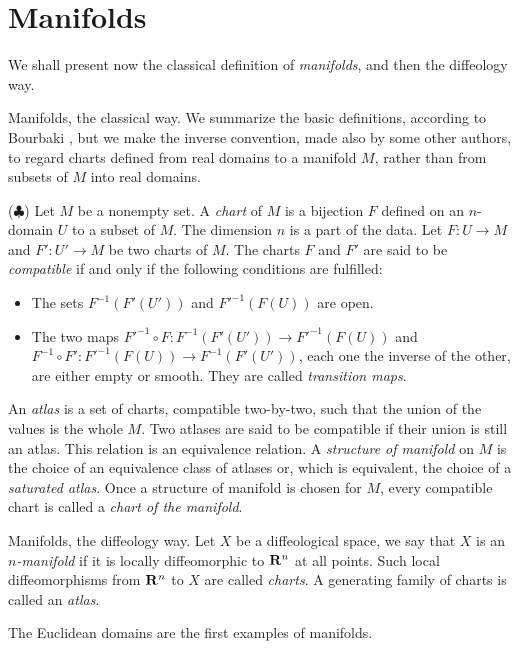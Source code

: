 \section{Manifolds}

We shall present now the classical definition of \emph{manifolds},
and then the diffeology way.

\begin{Article}{Manifolds, the classical way.}{}
  We summarize the basic definitions,
  according to Bourbaki \cite{Bou82},
  but we make the inverse convention,
  made also by some other authors,
  to regard charts defined from real domains to a manifold $M$,
  rather than from subsets of $M$ into real domains.

  ($\clubsuit$) Let $M$ be a nonempty set.
  A {\em chart} of $M$ is a bijection $F$ defined on an $n$-domain $U$ to a subset of $M$.
  The dimension $n$ is a part of the data.
  Let $F : U \to M$ and $F' : U' \to M$ be two charts of $M$.
  The charts $F$ and $F'$ are said to be \emph{compatible} if and only if the following conditions are fulfilled:
  \begin{itemize}
    \item[a)] The sets $F^{-1}(F'(U'))$ and $F'^{-1}(F(U))$ are open.
    \item[b)] The two maps $F'^{-1} \circ F : F^{-1}(F'(U')) \to F'^{-1}(F(U))$ and $F^{-1} \circ F' : F'^{-1}(F(U)) \to F^{-1}(F'(U'))$,
    each one the inverse of the other,
    are either empty or smooth.
    They are called \emph{transition maps}.
  \end{itemize}
  An \emph{atlas} is a set of charts,
  compatible two-by-two,
  such that the union of the values is the whole $M$.
  Two atlases are said to be compatible if their union is still an atlas.
  This relation is an equivalence relation.
  A \emph{structure of manifold} on $M$ is the choice of an equivalence class of atlases or,
  which is equivalent,
  the choice of a \emph{saturated atlas}.
  Once a structure of manifold is chosen for $M$,
  every compatible chart is called a \emph{chart of the manifold}.
\end{Article}

\begin{Article}{Manifolds, the diffeology way.}{}
  Let $X$ be a diffeological space,
  we say that $X$ is an \emph{$n$-manifold} if it is locally diffeomorphic to $\mathbf{R}^n$ at all points.
  Such local diffeomorphisms from $\mathbf{R}^n$ to $X$ are called \emph{charts}.
  A generating family of charts is called an \emph{atlas}.

  The Euclidean domains are the first examples of manifolds.
\end{Article}

